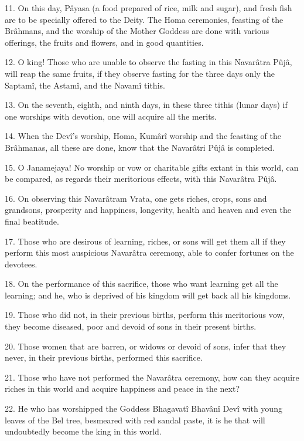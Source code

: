 11. On this day, P\^ayasa (a food prepared of rice, milk and sugar), and fresh fish are to be specially offered to the Deity. The Homa ceremonies, feasting of the Br\^ahmans, and the worship of the Mother Goddess are done with various offerings, the fruits and flowers, and in good quantities.

12. O king! Those who are unable to observe the fasting in this Navar\^atra Pûj\^a, will reap the same fruits, if they observe fasting for the three days only the Saptam\^i, the Astam\^i, and the Navam\^i tithis.

13. On the seventh, eighth, and ninth days, in these three tithis (lunar days) if one worships with devotion, one will acquire all the merits.

14. When the Dev\^i's worship, Homa, Kum\^ar\^i worship and the feasting of the Br\^ahmanas, all these are done, know that the Navar\^atri Pûj\^a is completed.

15. O Janamejaya! No worship or vow or charitable gifts extant in this world, can be compared, as regards their meritorious effects, with this Navar\^atra Pûj\^a.

16. On observing this Navar\^atram Vrata, one gets riches, crops, sons and grandsons, prosperity and happiness, longevity, health and heaven and even the final beatitude.

17. Those who are desirous of learning, riches, or sons will get them all if they perform this most auspicious Navar\^atra ceremony, able to confer fortunes on the devotees.

18. On the performance of this sacrifice, those who want learning get all the learning; and he, who is deprived of his kingdom will get back all his kingdoms.

19. Those who did not, in their previous births, perform this meritorious vow, they become diseased, poor and devoid of sons in their present births.

20. Those women that are barren, or widows or devoid of sons, infer that they never, in their previous births, performed this sacrifice.

21. Those who have not performed the Navar\^atra ceremony, how can they acquire riches in this world and acquire happiness and peace in the next?

22. He who has worshipped the Goddess Bhagavat\^i Bhav\^an\^i Dev\^i with young leaves of the Bel tree, besmeared with red sandal paste, it is he that will undoubtedly become the king in this world.

